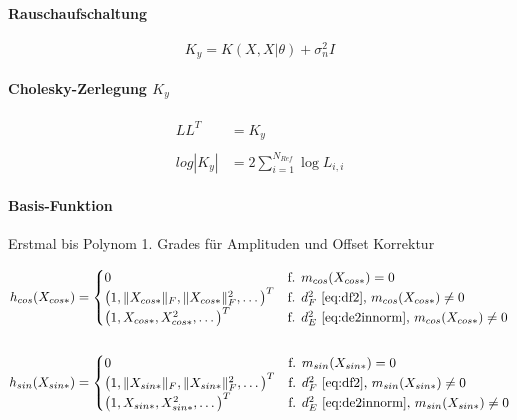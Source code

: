 \paragraph*{Rauschaufschaltung}


\begin{equation}\label{eq:addnoise}
	K_y = K(X, X|\theta) + \sigma_n^2 I
\end{equation}


\paragraph*{Cholesky-Zerlegung $K_y$}


\begin{align}\label{eq:chol}
		 LL^T &= K_y  \nonumber \\
		 \\
	log |K_y| &= 2 \sum_{i=1}^{N_{Ref}} \log L_{i,i} \nonumber
\end{align}


\paragraph*{Basis-Funktion}

Erstmal bis Polynom 1. Grades für Amplituden und Offset Korrektur

\begin{align}\label{eq:hfun}
	h_{cos}(X_{cos*}) &=
		\begin{cases}
			0								                          & \text{f. } m_{cos}(X_{cos*}) = 0 \\
			\big( 1, \|X_{cos*}\|_F, \|X_{cos*}\|_F^2, \ldots \big)^T & \text{f. } d_F^2 \text{ \eqref{eq:df2}, }       m_{cos}(X_{cos*}) \ne 0 \\
			\big( 1, X_{cos*}, X_{cos*}^2, \ldots \big)^T             & \text{f. } d_E^2 \text{ \eqref{eq:de2innorm}, } m_{cos}(X_{cos*}) \ne 0
		\end{cases} \nonumber \\
	\\
	h_{sin}(X_{sin*}) &=
		\begin{cases}
			0								                          & \text{f. } m_{sin}(X_{sin*}) = 0 \\
			\big( 1, \|X_{sin*}\|_F, \|X_{sin*}\|_F^2, \ldots \big)^T & \text{f. } d_F^2 \text{ \eqref{eq:df2}, }       m_{sin}(X_{sin*}) \ne 0 \\
			\big( 1, X_{sin*}, X_{sin*}^2, \ldots \big)^T             & \text{f. } d_E^2 \text{ \eqref{eq:de2innorm}, } m_{sin}(X_{sin*}) \ne 0
		\end{cases} \nonumber
\end{align}


